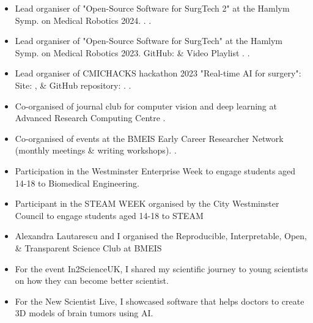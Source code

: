 \documentclass{mycv}
\begin{document}
\begin{itemize}
\item Lead organiser of "Open-Source Software for SurgTech 2" at the Hamlym Symp. on Medical Robotics 2024.
	\href{https://www.hamlynsymposium.org/events/open-source-software-for-surgical-technologies-2/}{\faExternalLink*}.
	.

\item Lead organiser of "Open-Source Software for SurgTech" at the Hamlym Symp. on Medical Robotics 2023.
	GitHub: \href{https://github.com/oss-for-surgtech/workshop-hamlyn2023}{\faGithub*} \&
    Video Playlist \href{https://youtube.com/playlist?list=PLtGJkyfu0klZlvZkPyDLArhjs7i39C-ld&si=wmOQZ2Qr5_QDWrg3}{\faYoutube}.
	.

\item Lead organiser of CMICHACKS hackathon 2023 "Real-time AI for surgery":
	Site: \href{https://cmic-ucl.github.io/CMICHACKS/edition2023/index.html}{\faExternalLink*}, \&
	GitHub repository: \href{https://github.com/SciKit-Surgery/cmicHACKS2}{\faGithub*}.
	.

\item Co-organised of journal club for computer vision and deep learning at Advanced Research Computing Centre
	.

\item Co-organised of events at the BMEIS Early Career Researcher Network (monthly meetings \& writing workshops).
	.
\item Participation in the Westminster Enterprise Week to engage students aged 14-18 to Biomedical Engineering.
\item Participant in the STEAM WEEK organised by the City Westminster Council to engage students aged 14-18 to STEAM
	\href{https://twitter.com/_mxochicale/status/1374407825607200769}{\faTwitter}
\item Alexandra Lautarescu and I organised the Reproducible, Interpretable, Open, \& Transparent Science Club at BMEIS
\item For the event In2ScienceUK, I shared my scientific journey to young scientists on how they can become better scientist.
\item For the New Scientist Live, I showcased software that helps doctors to create 3D models of brain tumors using AI.


\end{itemize}
\end{document}
